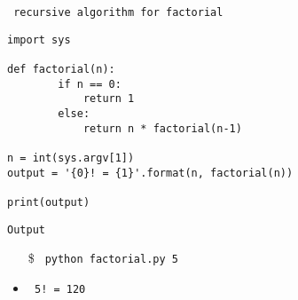 \begin{center}
 \texttt{
 recursive algorithm for factorial
} 
 \end{center}
\begin{verbatim}
import sys

def factorial(n):
		if n == 0:
			return 1
		else:
			return n * factorial(n-1)

n = int(sys.argv[1])
output = '{0}! = {1}'.format(n, factorial(n))

print(output)
\end{verbatim}
\begin{center}
\texttt{Output}
\end{center}
\begin{itemize}
\item[\$] \texttt{ python factorial.py 5}
\item\texttt{ 5! = 120 }
\end{itemize}
